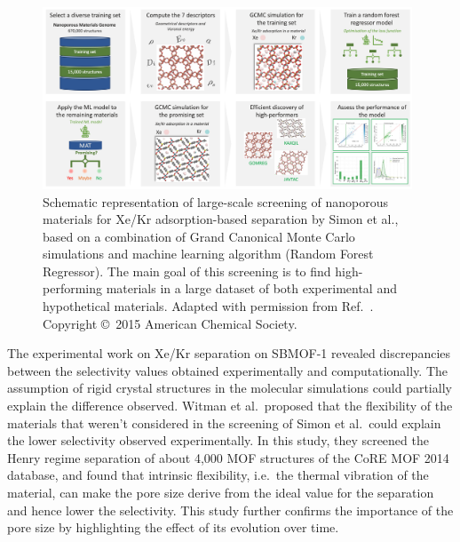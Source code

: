 \documentclass[main.tex]{subfiles}
\begin{document}
\begin{figure}[t]
  \centering
  \includegraphics[width=0.98\textwidth]{figures/1-screening/Simon.jpg}
  \caption{Schematic representation of large-scale screening of nanoporous materials for Xe/Kr adsorption-based separation by Simon et al.,\autocite{Simon_2015} based on a combination of Grand Canonical Monte Carlo simulations and machine learning algorithm (Random Forest Regressor). The main goal of this screening is to find high-performing materials in a large dataset of both experimental and hypothetical materials. 
  Adapted with permission from Ref.~\cite{Simon_2015}. Copyright \copyright\  2015 American Chemical Society.
  }\label{fgr:Simon}
\end{figure}

The experimental work on Xe/Kr separation on SBMOF-1 revealed discrepancies between the selectivity values obtained experimentally and computationally.\autocite{Banerjee_2016} {The assumption of rigid crystal structures in the molecular simulations could partially explain the difference observed.} Witman et al.\ proposed that the flexibility of the materials that weren't considered in the screening of Simon et al.\ could explain the lower selectivity observed experimentally.\autocite{Witman_2017} In this study, they screened the Henry regime separation of about 4,000 MOF structures of the CoRE MOF 2014 database\autocite{Chung_2014}, and found that intrinsic flexibility, i.e.\ the thermal vibration of the material, can make the pore size derive from the ideal value for the separation and hence lower the selectivity. This study further confirms the importance of the pore size by highlighting the effect of its evolution over time.
\end{document}
